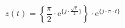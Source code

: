 \[
z(t) =  \left \{ \frac{\pi}{2} \cdot \textrm{e}^{\{ j \cdot \frac{\sqrt{\pi}}{2} \}} \right \} \cdot \textrm{e}^{\{ j \cdot \pi \cdot t \}}
\]
